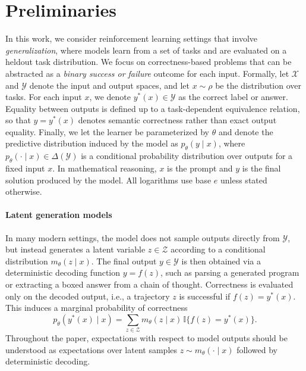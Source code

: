 \documentclass[10pt]{article} %
\begin{document}
\section{Preliminaries}
\label{sec:preliminaries}

In this work, we consider reinforcement learning settings that involve
\emph{generalization}, where models learn from a set of tasks and are evaluated
on a heldout task distribution. We focus on correctness-based problems that can
be abstracted as a \emph{binary success or failure} outcome for each input. 
Formally, let $\mathcal{X}$ and $\mathcal{Y}$ denote the input and output spaces,
and let $x \sim \rho$ be the distribution over tasks. For each input $x$, we
denote $y^\ast(x) \in \mathcal{Y}$ as the correct label or answer.
Equality between outputs is defined up to a task-dependent equivalence relation,
so that $y = y^\ast(x)$ denotes semantic correctness rather than exact output
equality.
Finally, we let the learner be parameterized by $\theta$ and denote the
predictive distribution induced by the model as $p_\theta(y \mid x)$, where
$p_\theta(\cdot \mid x) \in \Delta(\mathcal{Y})$ is a conditional probability
distribution over outputs for a fixed input $x$. In mathematical reasoning, $x$ is the prompt and $y$ is the final solution produced by the model. All logarithms use base $e$
unless stated otherwise.

\paragraph{Latent generation models}
In many modern settings, the model does not sample outputs directly from
$\mathcal{Y}$, but instead generates a latent variable
$z \in \mathcal{Z}$ according to a conditional distribution
$m_\theta(z \mid x)$. The final output $y \in \mathcal{Y}$ is then obtained via a
deterministic decoding function $y = f(z)$, such as parsing a generated program
or extracting a boxed answer from a chain of thought. Correctness is evaluated only on the decoded output, i.e., a trajectory $z$ is
successful if $f(z) = y^\ast(x)$.
This induces a marginal probability of correctness
\begin{equation}
p_\theta(y^\ast(x)\mid x)
=
\sum_{z \in \mathcal{Z}} m_\theta(z \mid x)\,\mathbb{I}\{f(z)=y^\ast(x)\}.
\end{equation}
Throughout the paper, expectations with respect to model
outputs should be understood as expectations over latent samples $z \sim
m_\theta(\cdot \mid x)$ followed by deterministic decoding.
\end{document}
